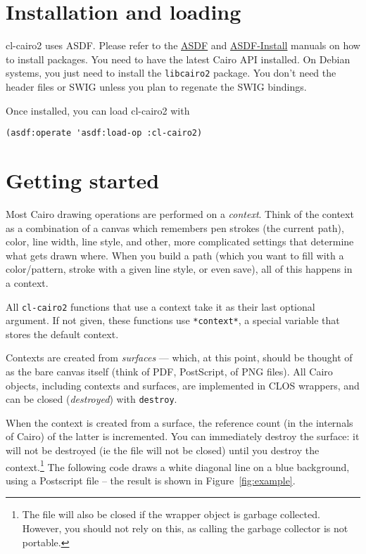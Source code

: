 \documentclass[12pt,letterpaper,dvipdfm]{article}
\begin{document}
\section{Installation and loading}
\label{sec:installation-loading}

cl-cairo2 uses ASDF.  Please refer to the
\href{http://www.cliki.net/asdf}{ASDF} and
\href{http://www.cliki.net/ASDF-Install}{ASDF-Install} manuals on how
to install packages.  You need to have the latest Cairo API installed.
On Debian systems, you just need to install the \verb!libcairo2!
package.  You don't need the header files or SWIG unless you plan to
regenate the SWIG bindings.

Once installed, you can load cl-cairo2 with
\begin{lstlisting}
(asdf:operate 'asdf:load-op :cl-cairo2)
\end{lstlisting}

\section{Getting started}
\label{sec:getting-started}


Most Cairo drawing operations are performed on a \emph{context}.
Think of the context as a combination of a canvas which remembers pen
strokes (the current path), color, line width, line style, and other,
more complicated settings that determine what gets drawn where.  When
you build a path (which you want to fill with a color/pattern, stroke
with a given line style, or even save), all of this happens in a
context.

All \verb!cl-cairo2! functions that use a context take it as
their last optional argument.  If not given, these functions use
\lstinline!*context*!, a special variable that stores the default
context.

Contexts are created from \emph{surfaces} --- which, at this point,
should be thought of as the bare canvas itself (think of PDF,
PostScript, of PNG files). All
Cairo objects, including contexts and surfaces, are implemented in
CLOS wrappers, and can be closed (\emph{destroyed}) with
\lstinline!destroy!.

When the context is created from a surface, the reference count (in
the internals of Cairo) of the latter is incremented.  You can
immediately destroy the surface: it will not be destroyed (ie the file
will not be closed) until you destroy the context.\footnote{The file
  will also be closed if the wrapper object is garbage collected.
  However, you should not rely on this, as calling the garbage
  collector is not portable.}  The following code draws a white
diagonal line on a blue background, using a Postscript file -- the
result is shown in Figure~\ref{fig:example}.
\end{document}
